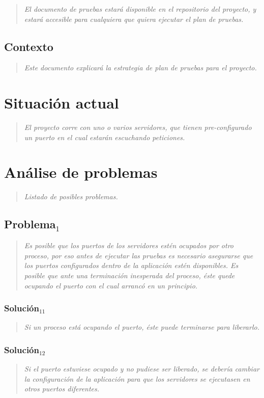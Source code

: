 \documentclass[DIV=calc,paper=a4,fontsize=11pt,onecolumn]{scrartcl}	 %
\newcommand{\hint}[1]{\begin{quote}\itshape #1 \end{quote}}
\begin{document}
\hint{El documento de pruebas estará disponible en el repositorio del proyecto, y estará accesible para cualquiera que quiera ejecutar el plan de pruebas.}

\subsection{Contexto}

\hint{Este documento explicará la estrategia de plan de pruebas para el proyecto.}

\section{Situación actual}

\hint{El proyecto corre con uno o varios servidores, que tienen pre-configurado un puerto en el cual estarán escuchando peticiones.
}

\section{Análise de problemas}

\hint{Listado de posibles problemas.}

\subsection{Problema$_1$}

\hint{Es posible que los puertos de los servidores estén ocupados por otro proceso, por eso antes de ejecutar las pruebas es necesario asegurarse que los puertos configurados dentro de la aplicación estén disponibles. Es posible que ante una terminación inesperada del proceso, éste quede ocupando el puerto con el cual arrancó en un principio.}

\subsubsection{Solución$_{11}$}

\hint{Si un proceso está ocupando el puerto, éste puede terminarse para liberarlo.}

\subsubsection{Solución$_{12}$}

\hint{Si el puerto estuviese ocupado y no pudiese ser liberado, se debería cambiar la configuración de la aplicación para que los servidores se ejecutasen en otros puertos diferentes.}
\end{document}
